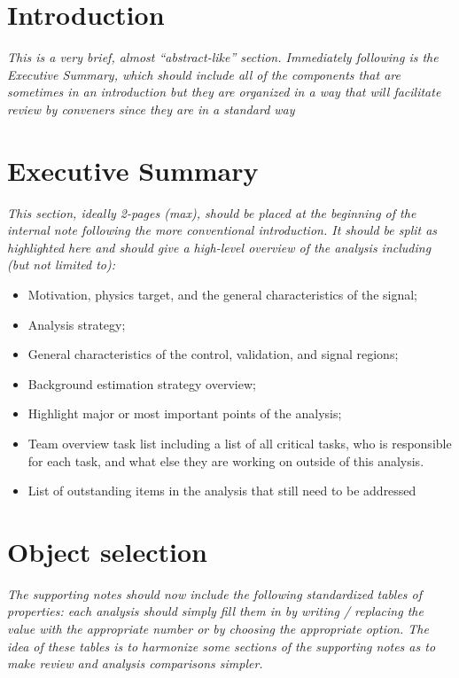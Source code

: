 \documentclass[NOTE, atlasdraft=true, texlive=2016, USenglish]{\ATLASLATEXPATH atlasdoc}
\author{ATLAS EXOT Group}
\begin{document}
\maketitle

\tableofcontents

\section{Introduction}
\textit{This is a very brief, almost ``abstract-like'' section.  Immediately following is the 
Executive Summary, which should include all of the components that are sometimes in an 
introduction but they are organized in a way that will facilitate review by conveners
since they are in a standard way}


\section{Executive Summary}
\textit{This section, ideally 2-pages (max), should be placed at the beginning of the internal 
note following the more conventional introduction.  It should be split as highlighted here and should 
give a high-level overview of the analysis including (but not limited to):}

\begin{itemize}
\item Motivation, physics target, and the general characteristics of the signal;
\item Analysis strategy;
\item General characteristics of the control, validation, and signal regions;
\item Background estimation strategy overview;
\item Highlight major or most important points of the analysis;
\item Team overview task list including a list of all critical tasks, who is responsible for each task, and what else they are working on outside of this analysis.
\item List of outstanding items in the analysis that still need to be addressed
\end{itemize}


\section{Object selection}
\textit{The supporting notes should now include the following standardized tables of properties: 
each analysis should simply fill them in by writing / replacing the value with the appropriate 
number or by choosing the appropriate option. The idea of these tables is to harmonize some sections 
of the supporting notes as to make review and analysis comparisons simpler.}
\end{document}
